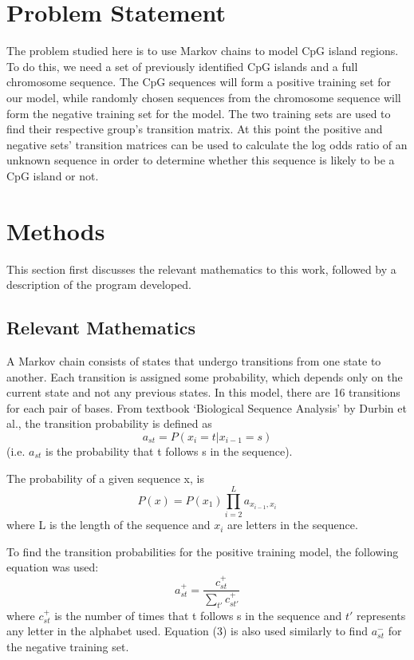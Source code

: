 \documentclass{acm_proc_article-sp}
\begin{document}
\section{Problem Statement}
The problem studied here is to use Markov chains to model CpG island regions.  To do this, we need a set of previously identified CpG islands and a full chromosome sequence.  The CpG sequences will form a positive training set for our model, while randomly chosen sequences from the chromosome sequence will form the negative training set for the model.  The two training sets are used to find their respective group's transition matrix.  At this point the positive and negative sets' transition matrices can be used to calculate the log odds ratio of an unknown sequence in order to determine whether this sequence is likely to be a CpG island or not.  

\section{Methods}
This section first discusses the relevant mathematics to this work, followed by a description of the program developed.
\subsection{Relevant Mathematics}
\label{sec:math}
A Markov chain consists of states that undergo transitions from one state to another.  Each transition is assigned some probability, which depends only on the current state and not any previous states.  In this model, there are 16 transitions for each pair of bases.  From textbook `Biological Sequence Analysis' by Durbin et al., the transition probability is defined as
 \begin{equation}a_{st} = P(x_{i} = t | x_{i-1} = s)\end{equation}
(i.e. $a_{st}$ is the probability that t follows s in the sequence).  

The probability of a given sequence x, is 
\begin{equation} P(x) = P(x_{1}) \prod\limits_{i=2}^L a_{x_{i-1},x_{i}} \end{equation}
where L is the length of the sequence and $x_{i}$ are letters in the sequence.

To find the transition probabilities for the positive training model, the following equation was used:
\begin{equation} a_{st}^+ = \frac{c_{st}^+}{\sum_{t'}c_{st'}^+}\end{equation}
where $c_{st}^+$ is the number of times that t follows s in the sequence and $t'$ represents any letter in the alphabet used.  Equation (3) is also used similarly to find $a_{st}^-$ for the negative training set.
\end{document}
